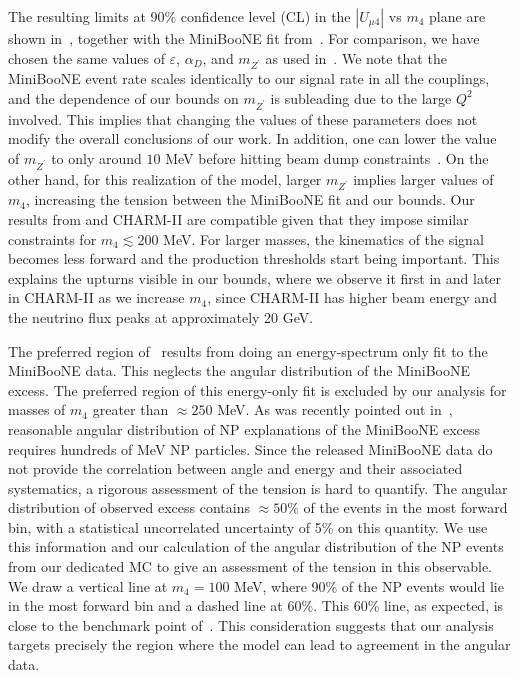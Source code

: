 The resulting limits at 90\% confidence level (CL)  in the $|U_{\mu 4}|$ vs $m_4$ plane are shown in~, together with the MiniBooNE fit from~\cite{Bertuzzo:2018itn}. For comparison, we have chosen the same values of $\varepsilon$, $\alpha_D$, and $m_{Z^\prime}$ as used in~\cite{Bertuzzo:2018itn}. 
We note that the MiniBooNE event rate scales identically to our signal rate in all the couplings, and the dependence of our bounds on $m_{Z^\prime}$ is subleading due to the large $Q^2$ involved. 
This implies that changing the values of these parameters does not modify the overall conclusions of our work. In addition, one can lower the value of $m_{Z^\prime}$ to only around $10$ MeV before hitting beam dump constraints~\cite{Bauer:2018onh}. 
On the other hand, for this realization of the model, larger $m_{Z^\prime}$ implies larger values of $m_4$, increasing the tension between the MiniBooNE fit and our bounds.
Our results from \minerva and CHARM-II are compatible given that 
they impose similar constraints for $m_4 \lesssim 200 $ MeV. For larger masses, the kinematics of the signal becomes less forward and the production thresholds start being important. This explains the upturns visible in our bounds, where we observe it first in \minerva and later in CHARM-II as we increase $m_4$, since CHARM-II has higher beam energy and the neutrino flux peaks at approximately 20 GeV.

The preferred region of~\cite{Bertuzzo:2018itn} results from doing an energy-spectrum only fit to the MiniBooNE data. This neglects the angular distribution of the MiniBooNE excess. The preferred region of this energy-only fit is excluded by our analysis for masses of $m_4$ greater than $\approx 250$ MeV. As was recently pointed out in~\cite{Jordan:2018qiy}, reasonable angular distribution of NP explanations of the MiniBooNE excess requires hundreds of MeV NP particles.
Since the released MiniBooNE data do not provide the correlation between angle and energy and their associated systematics, a rigorous assessment of the tension is hard to quantify. The angular distribution of observed excess contains $\approx 50\%$ of the events in the most forward bin, with a statistical uncorrelated uncertainty of 5\% on this quantity.
We use this information and our calculation of the angular distribution of the NP events from our dedicated MC to give an assessment of the tension in this observable. We draw a vertical line at $m_4 = 100$ MeV, where 90\% of the NP events would lie in the most forward bin and a dashed line at 60\%. 
This 60\% line, as expected, is close to the benchmark point of~\cite{Bertuzzo:2018ftf}. This consideration suggests that our analysis targets precisely the region where the model can lead to agreement in the angular data. 

